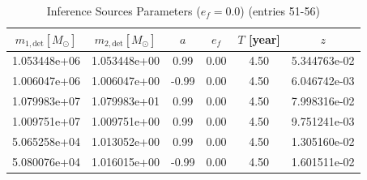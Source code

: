 \documentclass{article}
\begin{document}
\clearpage

\begin{table}[htbp]
\centering
\caption{Inference Sources Parameters ($e_f=0.0$) (entries 51-56)}
\label{tab:inference_sources_ef0_2}
\begin{tabular}{cccccc}
\hline
$m_{1,\mathrm{det}} [M_\odot]$ & $m_{2,\mathrm{det}} [M_\odot]$ & $a$ & $e_f$ & $T$ [year] & $z$ \\
\hline
1.053448e+06 & 1.053448e+00 & 0.99 & 0.00 & 4.50 & 5.344763e-02 \\
1.006047e+06 & 1.006047e+00 & -0.99 & 0.00 & 4.50 & 6.046742e-03 \\
1.079983e+07 & 1.079983e+01 & 0.99 & 0.00 & 4.50 & 7.998316e-02 \\
1.009751e+07 & 1.009751e+00 & 0.99 & 0.00 & 4.50 & 9.751241e-03 \\
5.065258e+04 & 1.013052e+00 & 0.99 & 0.00 & 4.50 & 1.305160e-02 \\
5.080076e+04 & 1.016015e+00 & -0.99 & 0.00 & 4.50 & 1.601511e-02 \\
\hline
\end{tabular}
\end{table}

\clearpage
\end{document}
